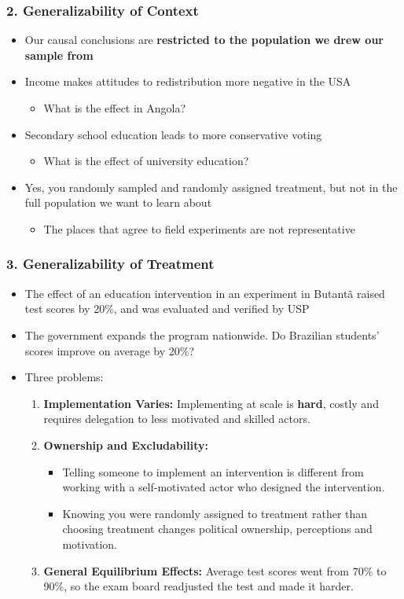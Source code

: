 \documentclass[xcolor=x11names,compress]{beamer}\usepackage[]{graphicx}\usepackage[]{color}
\renewcommand{\(}{\begin{columns}}
\renewcommand{\)}{\end{columns}}
\newcommand{\<}[1]{\begin{column}{#1}}
\renewcommand{\>}{\end{column}}
\begin{document}
\begin{frame}
\frametitle{2. Generalizability of Context}
\begin{itemize}
\item Our causal conclusions are \textbf{restricted to the population we drew our sample from}
\pause
\item Income makes attitudes to redistribution more negative in the USA
\pause
\begin{itemize}
\item What is the effect in Angola?
\end{itemize}
\pause
\item Secondary school education leads to more conservative voting
\pause
\begin{itemize}
\item What is the effect of university education?
\end{itemize}
\pause
\item Yes, you randomly sampled and randomly assigned treatment, but not in the full population we want to learn about
\pause
\begin{itemize}
\item The places that agree to field experiments are not representative
\end{itemize}
\end{itemize}
\end{frame}

\begin{frame}
\frametitle{3. Generalizability of Treatment}
\begin{itemize}
\item The effect of an education intervention in an experiment in Butant\~{a} raised test scores by 20\%, and was evaluated and verified by USP
\pause
\item The government expands the program nationwide. Do Brazilian students' scores improve on average by 20\%?
\pause
\item Three problems:
\begin{enumerate}
\item \textbf{Implementation Varies:} Implementing at scale is \textbf{hard}, costly and requires delegation to less motivated and skilled actors.
\pause
\item \textbf{Ownership and Excludability:} 
\begin{itemize}
\item Telling someone to implement an intervention is different from working with a self-motivated actor who designed the intervention. 
\pause
\item Knowing you were randomly assigned to treatment rather than choosing treatment changes political ownership, perceptions and motivation.
\end{itemize}
\pause
\item \textbf{General Equilibrium Effects:} Average test scores went from 70\% to 90\%, so the exam board readjusted the test and made it harder.
\end{enumerate}
\end{itemize}
\end{frame}
\end{document}
